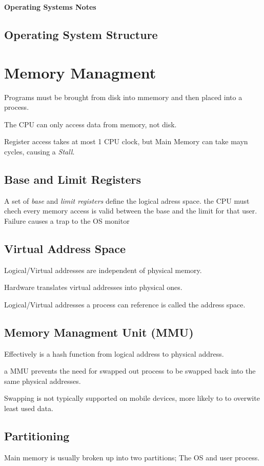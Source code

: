 \documentclass{article}
\begin{document}
\textbf{\Huge Operating Systems Notes}

\subsection{Operating System Structure}




\section{Memory Managment}
Programs must be brought from disk into mmemory and then placed into a process.

The CPU can only access data from memory, not disk.

Register access takes at most 1 CPU clock, but Main Memory can take mayn cycles, causing a \emph{Stall}.

\subsection{Base and Limit Registers}
A set of \emph{base} and \emph{limit registers} define the logical adress space. the CPU must chech every
memory access is valid between the base and the limit for that user. Failure causes a trap to the OS monitor

\subsection{Virtual Address Space}
Logical/Virtual addresses are independent of physical memory.

Hardware translates virtual addresses into physical ones.

Logical/Virtual addresses a process can reference is called the address space.

\subsection{Memory Managment Unit (MMU)}
Effectively is a hash function from logical address to physical address.

a MMU prevents the need for swapped out process to be swapped back into the same physical addresses.

Swapping is not typically supported on mobile devices, more likely to to overwite least used data.


\subsection{Partitioning}
Main memory is usually broken up into two partitions; The OS and user process.
\end{document}
